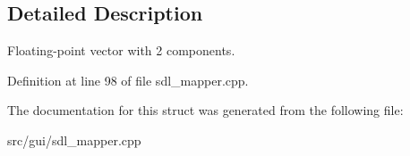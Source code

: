 \subsection{Detailed Description}
Floating-\/point vector with 2 components. 

Definition at line 98 of file sdl\-\_\-mapper.\-cpp.



The documentation for this struct was generated from the following file\-:\begin{DoxyCompactItemize}
\item 
src/gui/sdl\-\_\-mapper.\-cpp\end{DoxyCompactItemize}
